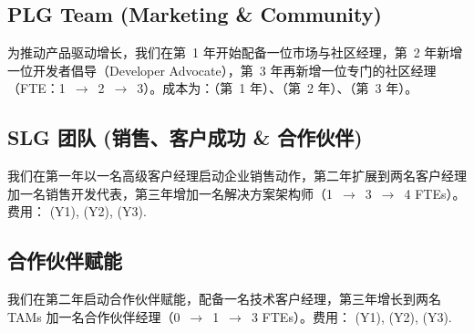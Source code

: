 \documentclass[11pt, a4paper, oneside]{article}
\begin{document}
\subsection{PLG Team (Marketing \& Community)}
为推动产品驱动增长，我们在第~1 年开始配备一位市场与社区经理，第~2 年新增一位开发者倡导（Developer Advocate），第~3 年再新增一位专门的社区经理（FTE：1~$\rightarrow$~2~$\rightarrow$~3）。成本为：\textbf{}（第~1 年）、\textbf{}（第~2 年）、\textbf{}（第~3 年）。



\subsection{SLG 团队 (销售、客户成功 \& 合作伙伴)}
我们在第一年以一名高级客户经理启动企业销售动作，第二年扩展到两名客户经理加一名销售开发代表，第三年增加一名解决方案架构师（1~$\rightarrow$~3~$\rightarrow$~4 FTEs）。费用：\textbf{} (Y1), \textbf{} (Y2), \textbf{} (Y3).

\subsection{合作伙伴赋能}
我们在第二年启动合作伙伴赋能，配备一名技术客户经理，第三年增长到两名 TAMs 加一名合作伙伴经理（0~$\rightarrow$~1~$\rightarrow$~3 FTEs）。费用：\textbf{} (Y1), \textbf{} (Y2), \textbf{} (Y3).
\end{document}
